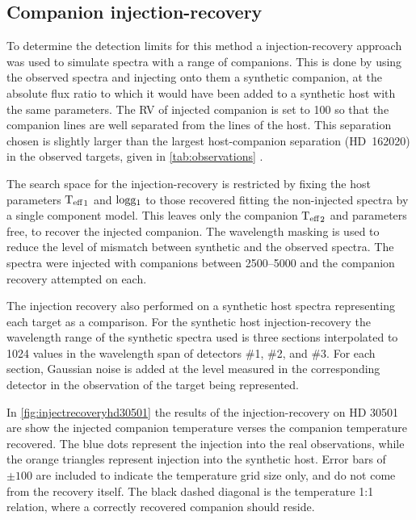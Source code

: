 
\subsection{Companion injection-recovery}
\label{subsec:injection-recovery}
To determine the detection limits for this method a injection-recovery approach was used to simulate spectra with a range of companions.
This is done by using the observed spectra and injecting onto them a synthetic companion, at the absolute flux ratio to which it would have been added to a synthetic host with the same parameters.
The {RV} of injected companion is set to 100\kmps{} so that the companion lines are well separated from the lines of the host.
This separation chosen is slightly larger than the largest host-companion separation ({HD~162020}) in the observed targets, given in \cref{tab:observations} \Rvtwo{}.

The search space for the injection-recovery is restricted by fixing the host parameters \({\textrm{T}_{\mathrm{eff}}}_{1}\) and \(\textrm{logg}{}_{1}\) to those recovered fitting the non-injected spectra by a single component model.
This leaves only the companion \({\textrm{T}_{\mathrm{eff}}}_{2}\) and \Rvtwo{} parameters free, to recover the injected companion.
The wavelength masking is used to reduce the level of mismatch between synthetic and the observed spectra.
The spectra were injected with companions between 2500--5000\K{} and the companion recovery attempted on each.

The injection recovery also performed on a synthetic host spectra representing each target as a comparison.
For the synthetic host injection-recovery the wavelength range of the synthetic spectra used is three sections interpolated to 1024 values in the wavelength span of detectors \#1, \#2, and \#3.
For each section, Gaussian noise is added at the level measured in the corresponding detector in the observation of the target being represented.

In \cref{fig:injectrecoveryhd30501} the results of the injection-recovery on {HD 30501} are show the injected companion temperature verses the companion temperature recovered.
The blue dots represent the injection into the real observations, while the orange triangles represent injection into the synthetic host.
Error bars of \(\pm100\)\K{} are included to indicate the temperature grid size only, and do not come from the recovery itself.
The black dashed diagonal is the temperature 1:1 relation, where a correctly recovered companion should reside.

